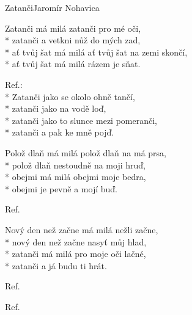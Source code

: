 \documentclass[10.5pt]{book}
\begin{document}
\begin{poem}{Zatanči}{Jaromír Nohavica}

\settowidth{\versewidth}{ať tvůj šat má milá ať tvůj šat na zemi skončí}

Zatanči má milá zatanči pro mé oči,\\*
zatanči a vetkni nůž do mých zad,\\*
ať tvůj šat má milá ať tvůj šat na zemi skončí,\\*
ať tvůj šat má milá rázem je sňat.

Ref.:\\*
Zatanči jako se okolo ohně tančí,\\*
zatanči jako na vodě loď,\\*
zatanči jako to slunce mezi pomeranči,\\*
zatanči a pak ke mně pojď.

Polož dlaň má milá polož dlaň na má prsa,\\*
polož dlaň nestoudně na moji hruď,\\*
obejmi má milá obejmi moje bedra,\\*
obejmi je pevně a mojí buď.

Ref.

Nový den než začne má milá nežli začne,\\*
nový den než začne nasyť můj hlad,\\*
zatanči má milá pro moje oči lačné,\\*
zatanči a já budu ti hrát.

Ref.

Ref.

\end{poem}
\end{document}
